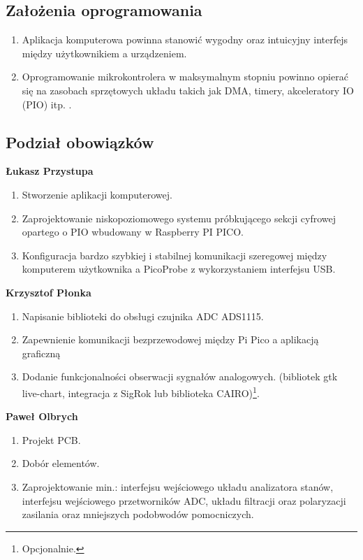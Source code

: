 \subsection{Założenia oprogramowania}
    \begin{enumerate}
        \item Aplikacja komputerowa powinna stanowić wygodny oraz intuicyjny interfejs
        między użytkownikiem a urządzeniem.
        \item Oprogramowanie mikrokontrolera w maksymalnym stopniu powinno opierać się na
        zasobach sprzętowych układu takich jak DMA, timery, akceleratory IO (PIO) itp. .
    \end{enumerate}
    
\subsection{Podział obowiązków}
    \textbf{Łukasz Przystupa}
    \begin{enumerate}
        \item Stworzenie aplikacji komputerowej.
        \item Zaprojektowanie niskopoziomowego systemu próbkującego sekcji cyfrowej opartego o PIO wbudowany w Raspberry PI PICO.
        \item Konfiguracja bardzo szybkiej i stabilnej komunikacji szeregowej między
        komputerem użytkownika a PicoProbe z wykorzystaniem interfejsu USB.
    \end{enumerate}

    \textbf{Krzysztof Płonka}
    \begin{enumerate}
        \item Napisanie biblioteki do obsługi czujnika ADC ADS1115.
        \item Zapewnienie komunikacji bezprzewodowej między Pi Pico a aplikacją graficzną
        \item Dodanie funkcjonalności obserwacji sygnałów analogowych.
        (bibliotek gtk live-chart, integracja z SigRok lub biblioteka CAIRO)\footnote{Opcjonalnie.}.\\ 
    \end{enumerate}

    \textbf{Paweł Olbrych}
    \begin{enumerate}
        \item Projekt PCB.
        \item Dobór elementów.
        \item Zaprojektowanie min.: interfejsu wejściowego układu analizatora stanów,
        interfejsu wejściowego przetworników ADC, układu filtracji oraz polaryzacji zasilania oraz
        mniejszych podobwodów pomocniczych. 
    \end{enumerate}
    